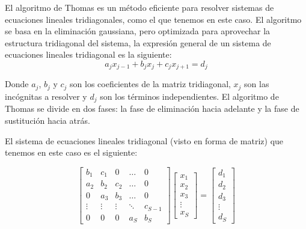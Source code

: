 \documentclass[10pt,onecolumn]{article}
\begin{document}
El algoritmo de Thomas es un método eficiente para resolver sistemas de ecuaciones lineales tridiagonales, como el que tenemos en este caso. El algoritmo se basa en la eliminación gaussiana, pero optimizada para aprovechar la estructura tridiagonal del sistema, la expresión general de un sistema de ecuaciones lineales tridiagonal es la siguiente:
\begin{equation}
    a_j x_{j-1} + b_j x_j + c_j x_{j+1} = d_j
\end{equation}

Donde $a_j$, $b_j$ y $c_j$ son los coeficientes de la matriz tridiagonal, $x_j$ son las incógnitas a resolver y $d_j$ son los términos independientes. El algoritmo de Thomas se divide en dos fases: la fase de eliminación hacia adelante y la fase de sustitución hacia atrás.

El sistema de ecuaciones lineales tridiagonal (visto en forma de matriz) que tenemos en este caso es el siguiente:

\begin{equation}
    \begin{bmatrix}
    b_1 & c_1 & 0 & \ldots & 0 \\
    a_2 & b_2 & c_2 & \ldots & 0 \\
    0 & a_3 & b_3 & \ldots & 0 \\
    \vdots & \vdots & \vdots & \ddots & c_{S-1} \\
    0 & 0 & 0 & a_S & b_S
    \end{bmatrix}
    \begin{bmatrix}
    x_1 \\
    x_2 \\
    x_3 \\
    \vdots \\
    x_S
    \end{bmatrix}
    =
    \begin{bmatrix}
    d_1 \\
    d_2 \\
    d_3 \\
    \vdots \\
    d_S
    \end{bmatrix}
\end{equation}
\end{document}
